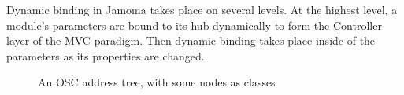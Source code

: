 \documentclass{article}
\begin{document}
Dynamic binding in Jamoma takes place on several levels.  At the highest level, a module's parameters are bound to its hub dynamically to form the Controller layer of the MVC paradigm.  Then dynamic binding takes place inside of the parameters as its properties are changed.

%
%


\begin{figure}
\centerline{}
\caption{An OSC address tree, with some nodes as classes}
\label{fig:structure}
\end{figure}
\end{document}
